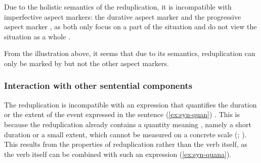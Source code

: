 Due to the holistic semantics of the reduplication, it is incompatible with imperfective aspect markers: the durative aspect marker  and the progressive aspect marker , as both only focus on  a part of the situation and do not view the situation as a whole \citep[Ch. 5]{XiaoMcEnery2004}.

From the illustration above, it seems that due to its semantics, reduplication can only be marked by  but not the other aspect markers.




\subsubsection{Interaction with other sentential components}\label{sec:adjuncts}

The reduplication is incompatible with an expression that quantifies the duration or the extent of the event expressed in the sentence (\ref{ex:syn-quan}) \citetext{\citealp[83--84]{Li1998}; \citealp[114--115]{Chen2005}}.
This is  because the reduplication already contains a quantity meaning \citetext{\citealp[84]{Li1998}; \citealp[114--115]{Chen2005}}, namely a short duration or a small extent,
which cannot be measured on a concrete scale (\citealt[155]{XiaoMcEnery2004}; \citealt[333]{SuiHu2016}).
This results from the properties of reduplication rather than the verb itself,
as the verb itself can be combined with such an expression (\ref{ex:syn-quana}).

\ea %
\label{ex:syn-quan}
\z
\z

